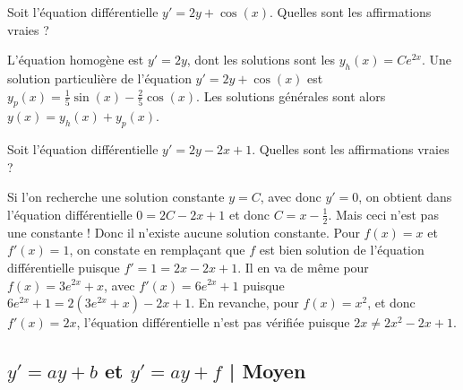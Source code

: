 \begin{question}
Soit l'équation différentielle $y' = 2y + \cos(x)$.
Quelles sont les affirmations vraies ?
\begin{answers}  
\end{answers}
\begin{explanations}
L'équation homogène est $y'=2y$, dont les solutions sont les $y_h(x) = Ce^{2x}$.
Une solution particulière de l'équation $y' = 2y +\cos(x)$ est $y_p(x) = \frac15\sin(x)-\frac25\cos(x)$.
Les solutions générales sont alors $y(x) = y_h(x) + y_p(x)$.
\end{explanations}
\end{question}



\begin{question}
Soit l'équation différentielle $y'=2y-2x+1$.
Quelles sont les affirmations vraies ?
\begin{answers}
\end{answers}
\begin{explanations}
Si l'on recherche une solution constante $y=C$, avec donc $y'=0$, on obtient dans l'équation différentielle $0 = 2C - 2x + 1$ et donc $C = x - \frac 12$. Mais ceci n'est pas une constante ! Donc il n'existe aucune solution constante. Pour $f(x) = x$ et $f'(x) = 1$, on constate en remplaçant que $f$ est bien solution de l'équation différentielle puisque $f' = 1 = 2x - 2x + 1$. Il en va de même pour $f(x) = 3e^{2x} + x$, avec $f'(x) = 6e^{2x} + 1$ puisque $6e^{2x}+1 = 2(3e^{2x}+x) - 2x + 1$. En revanche, pour $f(x) = x^2$, et donc $f'(x) = 2x$, l'équation différentielle n'est pas vérifiée puisque $2x \neq 2x^2 - 2x +1$.
\end{explanations}
\end{question}


\subsection{$y'=ay+b$ et $y'=ay+f$ | Moyen}


